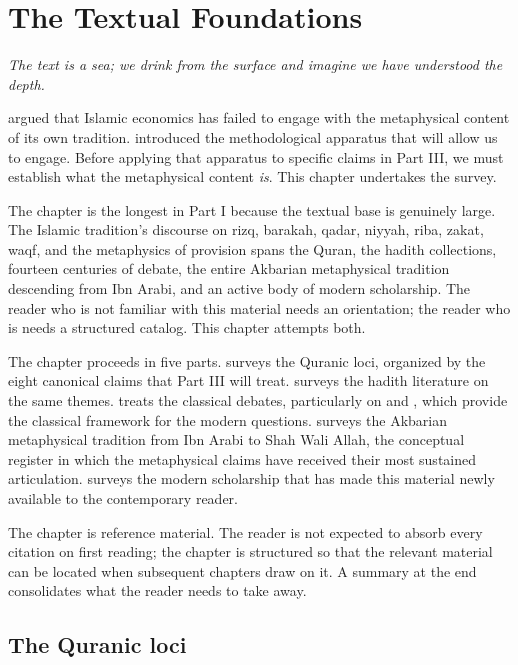 \chapter{The Textual Foundations}
\label{ch:textual-foundations}

\epigraph{\itshape The text is a sea; we drink from the surface and
imagine we have understood the depth.}{}

\noindent
{} argued that Islamic economics has failed to
engage with the metaphysical content of its own tradition.
 introduced the methodological apparatus that
will allow us to engage. Before applying that apparatus to specific
claims in Part III, we must establish what the metaphysical content
\emph{is}. This chapter undertakes the survey.

The chapter is the longest in Part I because the textual base is
genuinely large. The Islamic tradition's discourse on rizq, barakah,
qadar, niyyah, riba, zakat, waqf, and the metaphysics of provision
spans the Quran, the hadith collections, fourteen centuries of
 debate, the entire Akbarian metaphysical tradition
descending from Ibn Arabi, and an active body of modern scholarship.
The reader who is not familiar with this material needs an orientation;
the reader who is needs a structured catalog. This chapter attempts
both.

The chapter proceeds in five parts.
 surveys the Quranic loci, organized by the eight
canonical claims that Part III will treat.
 surveys the hadith literature on the same themes.
 treats the classical  debates,
particularly on  and , which provide the
classical framework for the modern questions.
 surveys the Akbarian metaphysical tradition from
Ibn Arabi to Shah Wali Allah, the conceptual register in which the
metaphysical claims have received their most sustained articulation.
 surveys the modern scholarship that
has made this material newly available to the contemporary reader.

The chapter is reference material. The reader is not expected to
absorb every citation on first reading; the chapter is structured so
that the relevant material can be located when subsequent chapters
draw on it. A summary at the end consolidates what the reader needs
to take away.

\section{The Quranic loci}
\label{sec:quran}

